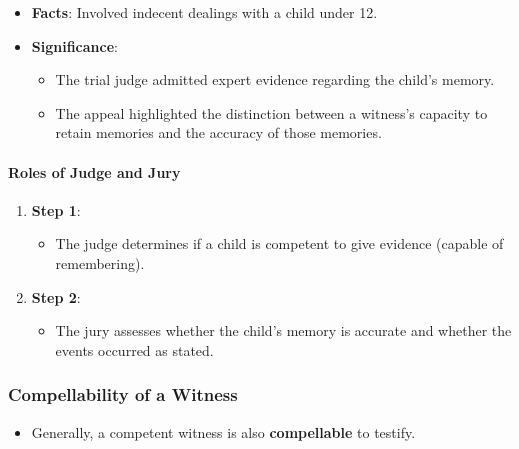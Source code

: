 \begin{itemize}
\tightlist
\item
  \textbf{Facts}: Involved indecent dealings with a child under 12.
\item
  \textbf{Significance}:

  \begin{itemize}
  \tightlist
  \item
    The trial judge admitted expert evidence regarding the child's
    memory.
  \item
    The appeal highlighted the distinction between a witness's capacity
    to retain memories and the accuracy of those memories.
  \end{itemize}
\end{itemize}

\paragraph{Roles of Judge and Jury}\label{roles-of-judge-and-jury}

\begin{enumerate}
\def\labelenumi{\arabic{enumi}.}
\tightlist
\item
  \textbf{Step 1}:

  \begin{itemize}
  \tightlist
  \item
    The judge determines if a child is competent to give evidence
    (capable of remembering).
  \end{itemize}
\item
  \textbf{Step 2}:

  \begin{itemize}
  \tightlist
  \item
    The jury assesses whether the child's memory is accurate and whether
    the events occurred as stated.
  \end{itemize}
\end{enumerate}

\subsubsection{Compellability of a
Witness}\label{compellability-of-a-witness}

\begin{itemize}
\tightlist
\item
  Generally, a competent witness is also \textbf{compellable} to
  testify.
\end{itemize}

